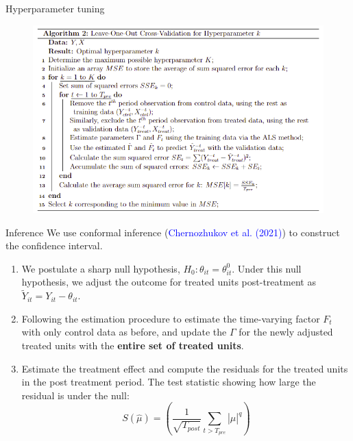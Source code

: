 \documentclass{beamer}
\begin{document}
\begin{frame}{Hyperparameter tuning}
\begin{figure}
    \centering
    \includegraphics[scale=0.8]{figs/cv_tuning.png}
\end{figure}
\end{frame}


\begin{frame}{Inference}
We use conformal inference (\textcolor{blue}{Chernozhukov et al. (2021)}) to construct the confidence interval.

\begin{enumerate}
    \item We postulate a sharp null hypothesis, $H_0: \theta_{it} = \theta_{it}^0$. Under this null hypothesis, we adjust the outcome for treated units post-treatment as $\tilde{Y}_{it} = Y_{it} - \theta_{it}$.
    \item Following the estimation procedure to estimate the time-varying factor $F_t$ with only control data as before, and update the $\Gamma$ for the newly adjusted treated units with the \textbf{entire set of treated units}.
    \item Estimate the treatment effect and compute the residuals for the treated units in the post treatment period. The test statistic showing how large the residual is under the null:
    \begin{equation*}
    S(\hat{\mu}) = \left(\frac{1}{\sqrt{T_{post}}}\sum_{t > T_{pre}} |\hat{\mu}|^q \right)
    \end{equation*}
\end{enumerate}
\end{frame}
\end{document}
